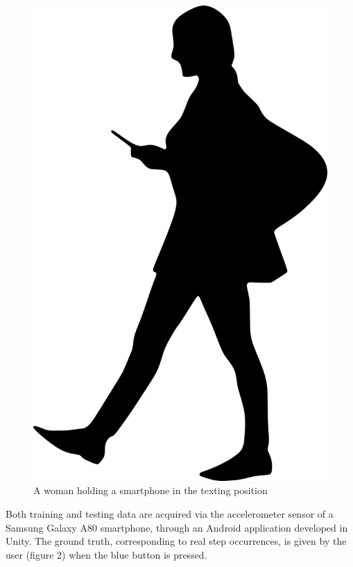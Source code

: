 \documentclass[conference]{IEEEtran}
\begin{document}
\begin{figure}[H]
    \centering
    \includegraphics[scale=0.1]{woman-2803967_1280.png}
    \caption{A woman holding a smartphone in the texting position}
    \label{fig:wom_smartphne}
\end{figure}

Both training and testing data are acquired via the accelerometer sensor of a Samsung Galaxy A80 smartphone, through an Android application developed in Unity. The ground truth, corresponding to real step occurrences, is given by the user (figure 2) when the blue button is pressed. 
\end{document}
